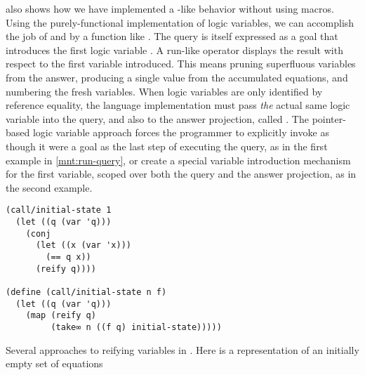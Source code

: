 \documentclass[sigplan,balance=true,pbalance=true,natbib=false]{acmart}
\begin{document}
 also shows how we have
implemented a -like behavior without using macros.
Using the purely-functional implementation of logic variables, we can
accomplish the job of  and  by a
function like . The query is itself
expressed as a goal that introduces the first logic
variable . A run-like operator displays the result with
respect to the first variable introduced. This means pruning
superfluous variables from the answer, producing a single value from
the accumulated equations, and numbering the fresh variables. When
logic variables are only identified by reference equality, the
language implementation must pass \emph{the} actual same logic
variable into the query, and also to the answer projection,
called . The pointer-based logic variable approach
forces the programmer to explicitly invoke  as
though it were a goal as the last step of executing the query, as in
the first example in \cref{mnt:run-query}, or create a special
variable introduction mechanism for the first variable, scoped over
both the query and the answer projection, as in the second example.

\begin{listing}[h]
  \begin{verbatim}
(call/initial-state 1
  (let ((q (var 'q)))
    (conj
      (let ((x (var 'x)))
        (== q x))
      (reify q))))

(define (call/initial-state n f)
  (let ((q (var 'q)))
    (map (reify q)
         (take∞ n ((f q) initial-state)))))
  \end{verbatim}
  \caption{Several approaches to reifying variables in . Here  is a representation of an initially empty set of equations}\label{mnt:run-query}
\end{listing}



\subsection{}
\end{document}
